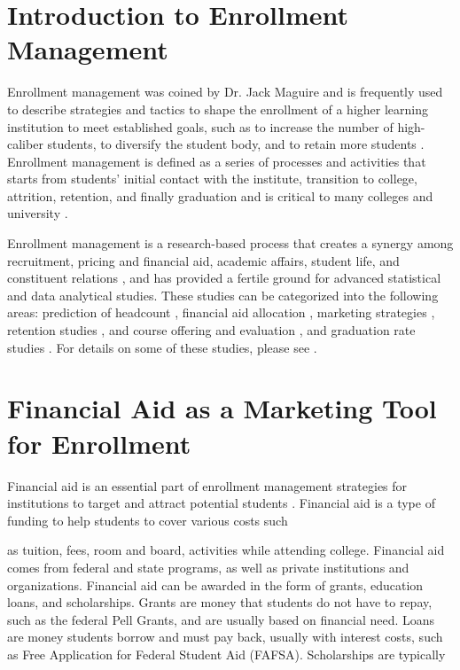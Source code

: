 \documentclass[12pt,english]{report}
\begin{document}
\section{Introduction to Enrollment Management}

Enrollment management was coined by Dr. Jack Maguire \citep{Maguire1976} and is
frequently used to describe strategies and tactics to shape the enrollment of
a higher learning institution to meet established goals, such as to increase
the
number of high-caliber students, to diversify the student body, and to retain
more students \citep{Kemerer1982}.  Enrollment management is defined as a
series of processes and activities that starts from students' initial contact
with the institute, transition to college, attrition, retention, and finally
graduation \citep{Hossler1990} and is critical to many colleges and university
\citep{Braunstein1999, Maltz2007, Aksenova2006}.

Enrollment management is a research-based process that creates a synergy among
recruitment, pricing and financial aid, academic affairs, student life, and
constituent relations \citep{huddlestonenrollment2000}, and has provided a
fertile ground for advanced statistical and data analytical studies. These
studies can be categorized into the following areas: prediction of headcount
\citep{Chang2006}, financial aid allocation \citep{leedsthe2014, Dynarski2003},
marketing strategies \citep{pandeyAdvertise}, retention studies 
\citep{grossinstitutional2015, Dynarski2003, Herzog2006}, and course offering
and evaluation \citep{SurjeetClassEnroll,luan2006courseoffer}, and graduation
rate studies \citep{Bailey2006}.  For details on some of these studies, please
see \citep{Luan2006}.

\section{Financial Aid as a Marketing Tool for Enrollment}
Financial aid is an essential part of enrollment management strategies for
institutions to target and attract potential students \citep{Dynarski2013}.  
Financial aid is a type of funding to help students to cover various costs such

as tuition, fees, room and board,  activities while attending college.
Financial 
aid comes from federal and state programs, as well as private institutions and 
organizations. Financial aid can be awarded in the form of grants, education
loans,
and scholarships.  Grants are money that students do not have to repay, such 
as the federal Pell Grants, and are usually based on financial need. Loans are
money students borrow and must pay back, usually with interest costs, such 
as Free Application for Federal Student Aid (FAFSA). Scholarships are typically
\end{document}
